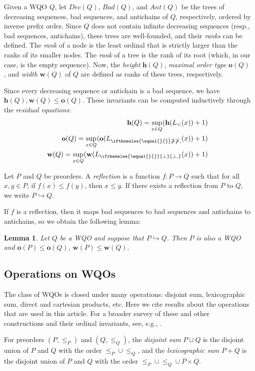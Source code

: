 \documentclass[runningheads]{llncs}
\let \leq \leqslant
\let \ngeq \ngeqslant
\let \embeds \hookrightarrow
\renewcommand \L [2][]{L_{\ifthenelse{\equal{#1}{}}\ngeq{\ngeq,#1}}(#2)}
\renewcommand \l [2][]{\o(\L[#1]{#2})}
\newcommand \K [2][]{L_{\ifthenelse{\equal{#1}{}}{\bot}{\bot,#1}}(#2)}
\renewcommand \k [2][]{\w(\K[#1]{#2})}
\def \h {\textbf{h}}
\def \o {\textbf{o}}
\def \w {\textbf{w}}
\newtheorem{lemma}{Lemma}
\begin{document}
Given a WQO $Q$, let $Dec(Q)$, $Bad(Q)$, and $Ant(Q)$ be the trees of decreasing sequences, bad sequences, and antichains of $Q$, respectively, ordered by inverse prefix order. Since $Q$ does not contain infinite decreasing sequences (resp., bad sequences, antichains), these trees are well-founded, and their \textit{ranks} can be defined. The \textit{rank} of a node is the least ordinal that is strictly larger than the ranks of its smaller nodes. The \textit{rank} of a tree is the rank of its root (which, in our case, is the empty sequence). Now, the \textit{height} $\h(Q)$, \textit{maximal order type} $\o(Q)$, and \textit{width} $\w(Q)$ of $Q$ are defined as ranks of these trees, respectively.

Since every decreasing sequence or antichain is a bad sequence, we have $\h(Q), \w(Q) \leq \o(Q)$. These invariants can be computed inductively through the \textit{residual equations}:
\begin{align*}
    \h(Q) = \sup_{x \in Q} (\h(L_<(x)) + 1)\\
    \o(Q) = \sup_{x \in Q} (\l{x} + 1)\\
    \w(Q) = \sup_{x \in Q} (\k{x} + 1)
\end{align*}

Let $P$ and $Q$ be preorders. A \textit{reflection} is a function $f \colon P \to Q$ such that for all $x, y \in P$, if $f(x) \leq f(y)$, then $x \leq y$. If there exists a reflection from $P$ to $Q$, we write $P \embeds Q$.

If $f$ is a reflection, then it maps bad sequences to bad sequences and antichains to antichains, so we obtain the following lemma:
\begin{lemma}\label{embedding}
    Let $Q$ be a WQO and suppose that $P \embeds Q$. Then $P$ is also a WQO and $\o(P) \leq \o(Q)$, $\w(P) \leq \w(Q)$.
\end{lemma}

\subsection{Operations on WQOs}

The class of WQOs is closed under many operations: disjoint sum, lexicographic sum, direct and cartesian products, etc. Here we cite results about the operations that are used in this article. For a broader survey of these and other constructions and their ordinal invariants, see, e.g., \cite{Dzamonja2020}.

For preorders $(P, \leq_P)$ and $(Q, \leq_Q)$, the \textit{disjoint sum} $P \sqcup Q$ is the disjoint union of $P$ and $Q$ with the order $\leq_P \cup \leq_Q$, and the \textit{lexicographic sum} $P + Q$ is the disjoint union of $P$ and $Q$ with the order $\leq_P \cup \leq_Q \cup P \times Q$.
\end{document}

